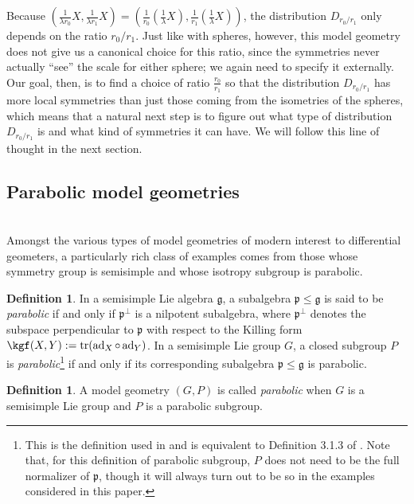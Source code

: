 \documentclass[12pt,a4paper]{amsart}
\theoremstyle{definition}
\newtheorem{definition}[theorem]{Definition}
\DeclareMathOperator{\ad}{ad}
\begin{document}
Because $(\tfrac{1}{\lambda r_0}X,\tfrac{1}{\lambda r_1}X)=(\tfrac{1}{r_0}(\tfrac{1}{\lambda}X),\tfrac{1}{r_1}(\tfrac{1}{\lambda}X))$, the distribution $D_{r_0/r_1}$ only depends on the ratio $r_0/r_1$. Just like with spheres, however, this model geometry does not give us a canonical choice for this ratio, since the symmetries never actually ``see'' the scale for either sphere; we again need to specify it externally. Our goal, then, is to find a choice of ratio $\tfrac{r_0}{r_1}$ so that the distribution $D_{r_0/r_1}$ has more local symmetries than just those coming from the isometries of the spheres, which means that a natural next step is to figure out what type of distribution $D_{r_0/r_1}$ is and what kind of symmetries it can have. We will follow this line of thought in the next section.

\subsection{Parabolic model geometries}\hfill\\
Amongst the various types of model geometries of modern interest to differential geometers, a particularly rich class of examples comes from those whose symmetry group is semisimple and whose isotropy subgroup is parabolic.

\begin{definition}In a semisimple Lie algebra $\mathfrak{g}$, a subalgebra $\mathfrak{p}\leq\mathfrak{g}$ is said to be \emph{parabolic} if and only if $\mathfrak{p}^\perp$ is a nilpotent subalgebra, where $\mathfrak{p}^\perp$ denotes the subspace perpendicular to $\mathfrak{p}$ with respect to the Killing form $\kgf(X,Y):=\mathrm{tr}(\ad_X\circ\ad_Y)$. In a semisimple Lie group $G$, a closed subgroup $P$ is \emph{parabolic}\footnote{This is the definition used in \cite{EricksonThesis} and is equivalent to Definition 3.1.3 of \cite{CapSlovakPG1}. Note that, for this definition of parabolic subgroup, $P$ does not need to be the full normalizer of $\mathfrak{p}$, though it will always turn out to be so in the examples considered in this paper.} if and only if its corresponding subalgebra $\mathfrak{p}\leq\mathfrak{g}$ is parabolic.\end{definition}

\begin{definition}A model geometry $(G,P)$ is called \emph{parabolic} when $G$ is a semisimple Lie group and $P$ is a parabolic subgroup.\end{definition}
\end{document}
